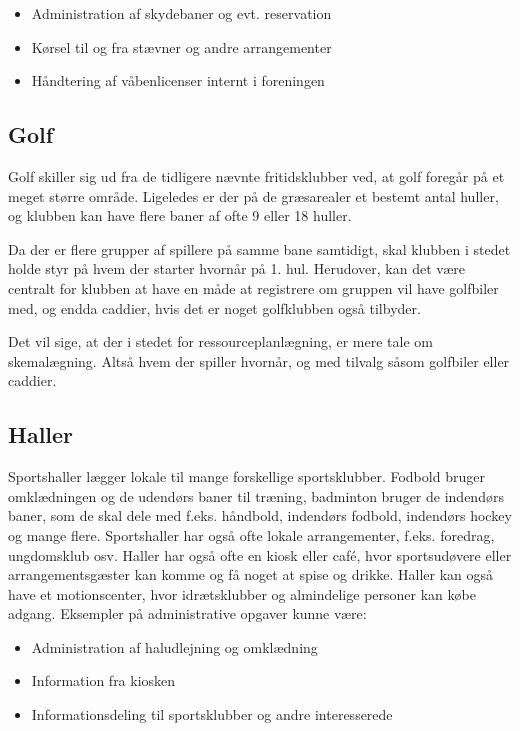 \begin{itemize}
  \item Administration af skydebaner og evt. reservation
  \item Kørsel til og fra stævner og andre arrangementer
  \item Håndtering af våbenlicenser internt i foreningen
\end{itemize}


\subsection{Golf}

Golf skiller sig ud fra de tidligere nævnte fritidsklubber ved, at golf foregår på et meget større område.
Ligeledes er der på de græsarealer et bestemt antal huller, og klubben kan have flere baner af ofte 9 eller 18
huller.

Da der er flere grupper af spillere på samme bane samtidigt, skal klubben i stedet holde styr på hvem der
starter hvornår på 1. hul. Herudover, kan det være centralt for klubben at have en måde at
registrere om gruppen vil have golfbiler med, og endda caddier, hvis det er noget golfklubben også tilbyder.

Det vil sige, at der i stedet for ressourceplanlægning, er mere tale om skemalægning. Altså hvem der spiller
hvornår, og med tilvalg såsom golfbiler eller caddier.


\subsection{Haller}

Sportshaller lægger lokale til mange forskellige sportsklubber. Fodbold bruger omklædningen og de
udendørs baner til træning, badminton bruger de indendørs baner, som de skal dele med f.eks. håndbold,
indendørs fodbold, indendørs hockey og mange flere. Sportshaller har også ofte lokale arrangementer, f.eks.
foredrag, ungdomsklub osv. Haller har også ofte en kiosk eller café, hvor sportsudøvere eller
arrangementsgæster kan komme og få noget at spise og drikke. Haller kan også have et motionscenter, hvor
idrætsklubber og almindelige personer kan købe adgang\citep{spt_hal}. Eksempler på administrative opgaver
kunne være:

\begin{itemize}
  \item Administration af haludlejning og omklædning 
  \item Information fra kiosken
  \item Informationsdeling til sportsklubber og andre interesserede
\end{itemize}


